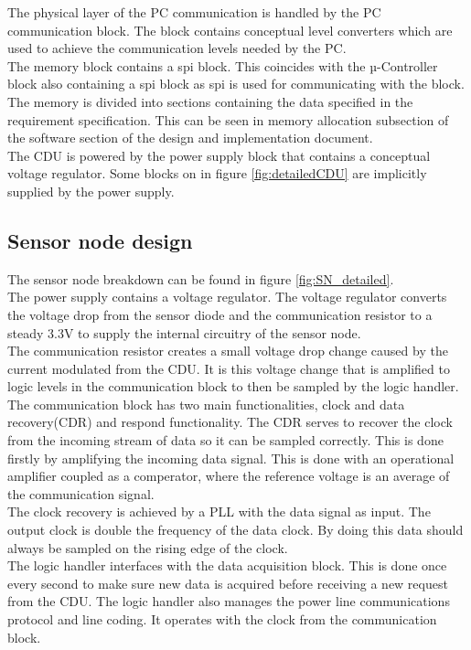 The physical layer of the PC communication is handled by the PC communication block. The block contains conceptual level converters which are used to achieve the communication levels needed by the PC.\\
The memory block contains a spi block. This coincides with the µ-Controller block also containing a spi block as spi is used for communicating with the block. The memory is divided into sections containing the data specified in the requirement specification. This can be seen in memory allocation subsection of the software section of the design and implementation document.\\
The CDU is powered by the power supply block that contains a conceptual voltage regulator. Some blocks on in figure \ref{fig:detailedCDU} are implicitly supplied by the power supply.
\subsection{Sensor node design}
The sensor node breakdown can be found in figure \ref{fig:SN_detailed}.\\
The power supply contains a voltage regulator. The voltage regulator converts the voltage drop from the sensor diode and the communication resistor to a steady 3.3V to supply the internal circuitry of the sensor node.\\
The communication resistor creates a small voltage drop change caused by the current modulated from the CDU. It is this voltage change that is amplified to logic levels in the communication block to then be sampled by the logic handler.\\
The communication block has two main functionalities, clock and data recovery(CDR) and respond functionality. The CDR serves to recover the clock from the incoming stream of data so it can be sampled correctly. This is done firstly by amplifying the incoming data signal. This is done with an operational amplifier coupled as a comperator, where the reference voltage is an average of the communication signal.\\
The clock recovery is achieved by a PLL with the data signal as input. The output clock is double the frequency of the data clock. By doing this data should always be sampled on the rising edge of the clock.\\
The logic handler interfaces with the data acquisition block. This is done once every second to make sure new data is acquired before receiving a new request from the CDU. The logic handler also manages the power line communications protocol and line coding. It operates with the clock from the communication block.\\
